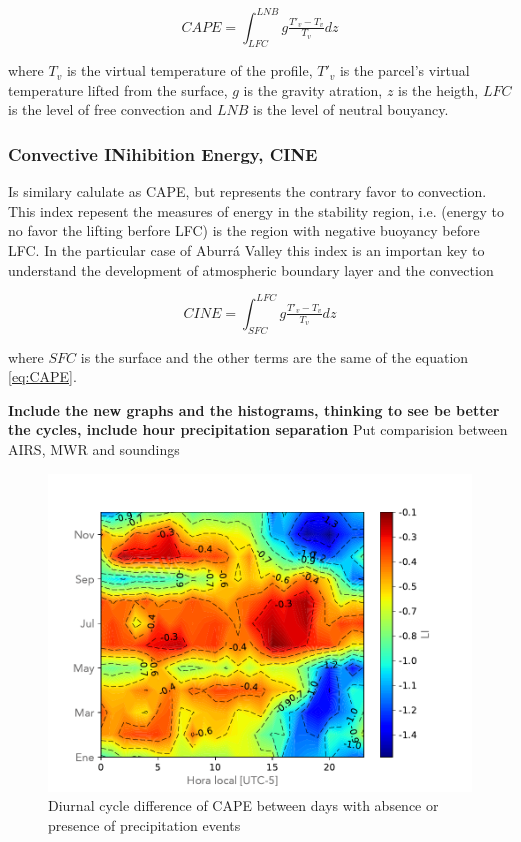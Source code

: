 \documentclass[	DIV=calc,%
							paper=a4,%
							fontsize=11pt,%
							twocolumn]{scrartcl}	 					%
\begin{document}
\begin{equation}
CAPE = \int_{LFC}^{LNB}g\tfrac{T'_v-T_v}{T_v}dz
\label{eq:CAPE}
\end{equation}

where  $T_v$ is the virtual temperature of the profile, $T'_v$ is the parcel's virtual temperature lifted from the surface, $g$ is the gravity atration, $z$ is the heigth, $LFC$ is the level of free convection and $LNB$ is the level of neutral bouyancy.

\subsubsection{Convective INihibition Energy, CINE}
Is similary calulate as CAPE, but represents the contrary favor to convection. This index repesent the measures of energy in the stability region, i.e. (energy to no favor the lifting berfore LFC) is the region with negative buoyancy before LFC. In the particular case of Aburrá Valley this index is an importan key to understand the development of atmospheric boundary layer and the convection 


\begin{equation}
CINE = \int_{SFC}^{LFC}g\tfrac{T'_v-T_v}{T_v}dz
\label{eq:CINE}
\end{equation}

where $SFC$ is the surface and the other terms are the same of the equation \ref{eq:CAPE}.


\textbf{Include the new graphs and the histograms, thinking to see be better the cycles, include hour precipitation separation}
Put comparision between AIRS, MWR and soundings
\begin{figure}[h!]
\centering
\includegraphics[width=1.0\linewidth]{Figuras/LI_Matrix_resta.pdf}
\caption{Diurnal cycle difference of CAPE between days with absence or presence of precipitation events }
\label{fig:LIdifference}
\end{figure}
\end{document}
